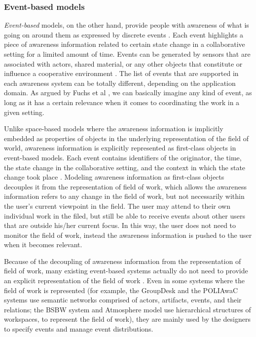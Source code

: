 \subsubsection{Event-based models} %
\label{ssub:event_based_model}
\emph{Event-based} models, on the other hand, provide people with awareness of what is going on around them as expressed by discrete events \cite{rittenbruch2009a}. Each event highlights a piece of awareness information related to certain state change in a collaborative setting for a limited amount of time. Events can be generated by sensors that are associated with actors, shared material, or any other objects that constitute or influence a cooperative environment \cite{prinz1999a}. The list of events that are supported in each awareness system can be totally different, depending on the application domain. As argued by Fuchs et al \cite{Fuchs1995}, we can basically imagine any kind of event, as long as it has a certain relevance when it comes to coordinating the work in a given setting. 

Unlike space-based models where the awareness information is implicitly embedded as properties of objects in the underlying representation of the field of world, awareness information is explicitly represented as first-class objects in event-based models. Each event contains identifiers of the originator, the time, the state change in the collaborative setting, and the context in which the state change took place \cite{fuchs1999a}. Modeling awareness information as first-class objects decouples it from the representation of field of work, which allows the awareness information refers to any change in the field of work, but not necessarily within the user's current viewpoint in the field. The user may attend to their own individual work in the filed, but still be able to receive events about other users that are outside his/her current focus. In this way, the user does not need to monitor the field of work, instead the awareness information is pushed to the user when it becomes relevant.

Because of the decoupling of awareness information from the representation of field of work, many existing event-based systems actually do not need to provide an explicit representation of the field of work \cite{prinz1999a,Fitzpatrick2002}. Even in some systems where the field of work is represented (for example, the GroupDesk \cite{Fuchs1995} and the POLIAwaC systems \cite{sohlenkamp2000po} use semantic networks comprised of actors, artifacts, events, and their relations; the BSBW system \cite{Bentley1995} and Atmosphere model use hierarchical structures of workspaces, to represent the field of work), they are mainly used by the designers to specify events and manage event distributions. 

